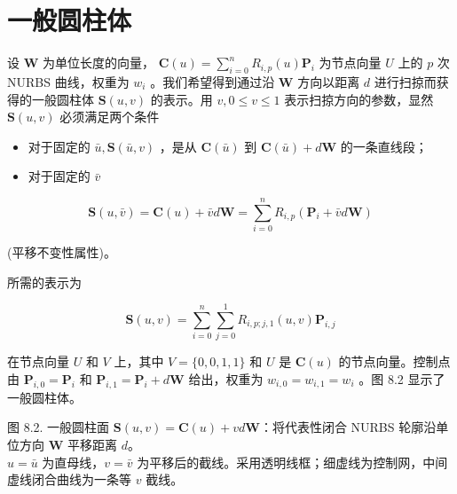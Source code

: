 \documentclass[../main.tex]{subfiles}
\begin{document}
\section{一般圆柱体}

设 \(\mathbf{W}\) 为单位长度的向量， \(\mathbf{C}\left( u\right)  = \mathop{\sum }\limits_{{i = 0}}^{n}{R}_{i,p}\left( u\right) {\mathbf{P}}_{i}\) 为节点向量 \(U\) 上的 \(p\) 次 NURBS 曲线，权重为 \({w}_{i}\) 。我们希望得到通过沿 \(\mathbf{W}\) 方向以距离 \(d\) 进行扫掠而获得的一般圆柱体 \(\mathbf{S}\left( {u,v}\right)\) 的表示。用 \(v,0 \leq  v \leq  1\) 表示扫掠方向的参数，显然 \(\mathbf{S}\left( {u,v}\right)\) 必须满足两个条件

\begin{itemize}
\item 对于固定的 \(\bar{u},\mathbf{S}\left( {\bar{u},v}\right)\) ，是从 \(\mathbf{C}\left( \bar{u}\right)\) 到 \(\mathbf{C}\left( \bar{u}\right)  + d\mathbf{W}\) 的一条直线段；
\end{itemize}

\begin{itemize}
\item 对于固定的 \(\bar{v}\)
\end{itemize}

\[
\mathbf{S}\left( {u,\bar{v}}\right)  = \mathbf{C}\left( u\right)  + \bar{v}d\mathbf{W} = \mathop{\sum }\limits_{{i = 0}}^{n}{R}_{i,p}\left( {{\mathbf{P}}_{i} + \bar{v}d\mathbf{W}}\right)
\]

(平移不变性属性)。

所需的表示为

\[
\mathbf{S}\left( {u,v}\right)  = \mathop{\sum }\limits_{{i = 0}}^{n}\mathop{\sum }\limits_{{j = 0}}^{1}{R}_{i,p;j,1}\left( {u,v}\right) {\mathbf{P}}_{i,j} \tag{8.2}
\]

在节点向量 \(U\) 和 \(V\) 上，其中 \(V = \{ 0,0,1,1\}\) 和 \(U\) 是 \(\mathbf{C}\left( u\right)\) 的节点向量。控制点由 \({\mathbf{P}}_{i,0} = {\mathbf{P}}_{i}\) 和 \({\mathbf{P}}_{i,1} = {\mathbf{P}}_{i} + d\mathbf{W}\) 给出，权重为 \({w}_{i,0} = {w}_{i,1} = {w}_{i}\) 。图 8.2 显示了一般圆柱体。

\begin{center}
\begin{minipage}{30cm}
\vspace*{.6\baselineskip}
\centering
{}
\par\smallskip
图 8.2. 一般圆柱面 $\mathbf S(u,v)=\mathbf C(u)+vd\mathbf W$：将代表性闭合 NURBS 轮廓沿单位方向 $\mathbf W$ 平移距离 $d$。\\
$u=\bar u$ 为直母线，$v=\bar v$ 为平移后的截线。采用透明线框；细虚线为控制网，中间虚线闭合曲线为一条等 $v$ 截线。
\end{minipage}
\end{center}
\end{document}
